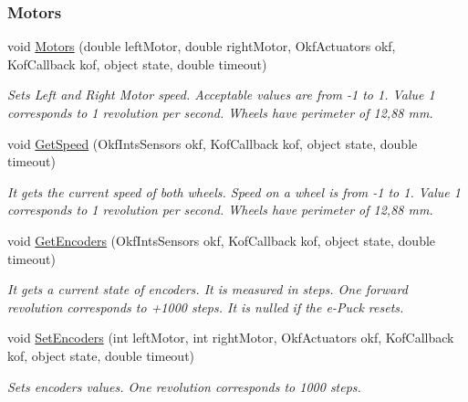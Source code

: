 \subsubsection*{Motors} %
\label{ssub:Motors}
  \begin{DoxyCompactItemize}

  \item void \hyperlink{class_elib_1_1_epuck_a4598315e376ddca08db145d5eaa22efb}{Motors} (double leftMotor, double rightMotor, OkfActuators okf, KofCallback kof, object state, double timeout)
  \begin{DoxyCompactList}\small\item\em Sets Left and Right Motor speed. Acceptable values are from -\/1 to 1. Value 1 corresponds to 1 revolution per second. Wheels have perimeter of 12,88 mm. \item\end{DoxyCompactList}
    
  \item void \hyperlink{class_elib_1_1_epuck_a8e552122cbe0eb95ac82d63018831697}{GetSpeed} (OkfIntsSensors okf, KofCallback kof, object state, double timeout)
  \begin{DoxyCompactList}\small\item\em It gets the current speed of both wheels. Speed on a wheel is from -\/1 to 1. Value 1 corresponds to 1 revolution per second. Wheels have perimeter of 12,88 mm. \item\end{DoxyCompactList}

  \item  void \hyperlink{class_elib_1_1_epuck_adad61bb9ea144ca17533e59ddf583bc8}{GetEncoders} (OkfIntsSensors okf, KofCallback kof, object state, double timeout)
  \begin{DoxyCompactList}\small\item\em It gets a current state of encoders. It is measured in steps. One forward revolution corresponds to +1000 steps. 
  It is nulled if the e-\/Puck resets. \item\end{DoxyCompactList}

  \item void \hyperlink{class_elib_1_1_epuck_a8b0942a1bbf1b78115b0eedf77e535a0}{SetEncoders} (int leftMotor, int rightMotor, OkfActuators okf, KofCallback kof, object state, double timeout)
  \begin{DoxyCompactList}\small\item\em Sets encoders values. One revolution corresponds to 1000 steps. \item\end{DoxyCompactList}


\end{DoxyCompactItemize}
